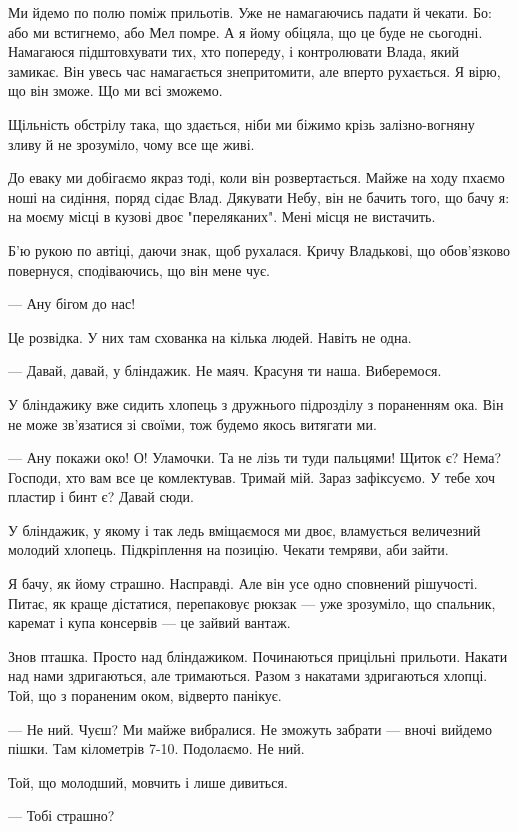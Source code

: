 Ми йдемо по полю поміж прильотів. Уже не намагаючись падати й чекати. Бо: або
ми встигнемо, або Мел помре. А я йому обіцяла, що це буде не сьогодні.
Намагаюся підштовхувати тих, хто попереду, і контролювати Влада, який замикає.
Він увесь час намагається знепритомити, але вперто рухається.  Я вірю, що він
зможе. Що ми всі зможемо.  

Щільність обстрілу така, що здається, ніби ми біжимо крізь залізно-вогняну
зливу й не зрозуміло, чому все ще живі. 

До еваку ми добігаємо якраз тоді, коли він розвертається. Майже на ходу пхаємо
ноші на сидіння, поряд сідає  Влад. Дякувати Небу, він не бачить того, що бачу
я: на моєму місці в кузові двоє "переляканих". Мені місця не вистачить. 

Б'ю рукою по автіці, даючи знак, щоб рухалася. Кричу Владькові, що обов'язково
повернуся, сподіваючись, що він мене чує. 

— Ану бігом до нас! 

Це розвідка. У них там схованка на кілька людей. Навіть не одна. 

— Давай, давай, у бліндажик. Не маяч. Красуня ти наша. Виберемося. 

У бліндажику вже сидить хлопець з дружнього підрозділу з пораненням ока. Він не
може зв'язатися зі своїми, тож будемо якось витягати ми. 

— Ану покажи око! О! Уламочки. Та не лізь ти туди пальцями!  Щиток є? Нема?
Господи, хто вам все це комлектував.  Тримай мій. Зараз зафіксуємо. У тебе хоч
пластир і бинт є? Давай сюди. 

У бліндажик, у якому і так ледь вміщаємося ми двоє, вламується величезний
молодий хлопець.  Підкріплення на позицію. Чекати темряви, аби зайти. 

Я бачу, як йому страшно. Насправді. Але він усе одно сповнений рішучості.
Питає, як краще дістатися,  перепаковує рюкзак — уже зрозуміло, що спальник,
каремат і купа консервів — це зайвий вантаж. 

Знов пташка.  Просто над бліндажиком. Починаються прицільні прильоти. Накати
над нами здригаються, але тримаються. Разом з накатами здригаються хлопці. Той,
що з пораненим оком, відверто панікує. 

— Не ний. Чуєш? Ми майже вибралися. Не зможуть забрати — вночі вийдемо пішки.
Там кілометрів 7-10. Подолаємо. Не ний. 

Той, що молодший, мовчить і лише дивиться. 

— Тобі страшно?

